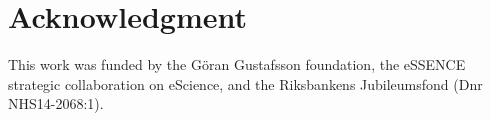 \documentclass[10pt, a4paper, conference, compsocconf]{IEEEtran}
\begin{document}


\section*{Acknowledgment}
This work was funded by the G\"oran Gustafsson foundation, the eSSENCE strategic collaboration on eScience, and the Riksbankens Jubileumsfond (Dnr NHS14-2068:1).




%
%
%






\end{document}
